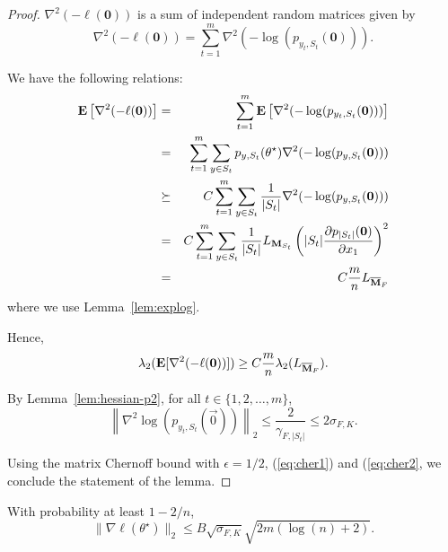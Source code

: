 \begin{proof}
$\nabla^2(-\ell({\bm 0}))$ is a sum of independent random matrices given by
$$
\nabla^2(-\ell({\bm 0})) = \sum_{t=1}^m \nabla^2 (-\log (p_{y_t,S_t}({\bm 0}))).
$$

We have the following relations:
\begin{eqnarray}
\mathbf{E}\left[\nabla^2 (-\ell({\bm 0}))\right] 
&=& \sum_{t=1}^m \mathbf{E}\left[\nabla^2(-\log (p_{y_t,S_t}({\bm 0})))\right]  \cr
&=& \sum_{t=1}^m \sum_{y\in S_t} p_{y,S_t}(\theta^\star)\nabla^2(-\log (p_{y,S_t}({\bm 0})))\cr
&\succeq & C \sum_{t=1}^m \sum_{y\in S_t} \frac{1}{|S_t|} \nabla^2(-\log (p_{y,S_t}({\bm 0})))\cr
& = & C \sum_{t=1}^m \sum_{y\in S_t} \frac{1}{|S_t|} L_{\mathbf{M}_{S_t}} \left(|S_t|\frac{\partial p_{|S_t|}(\mathbf{0})}{\partial x_1}\right)^2\nonumber 
\label{equ:temp}\\
&=& C \frac{m}{n}  L_{\overline{\mathbf{M}}_F}\nonumber
\label{eq:E-hessian}
\end{eqnarray}
where we use Lemma~\ref{lem:explog}.

Hence,
\begin{equation}
\lambda_2(\mathbf{E}[\nabla^2 (-\ell ({\bm 0}))]) \ge C \frac{m}{n} \lambda_2(L_{\overline{\mathbf{M}}_F}).
\label{eq:cher1}
\end{equation} 

By Lemma~\ref{lem:hessian-p2}, for all $t\in \{1,2,\ldots,m\}$,
\begin{equation}
\left\| \nabla^2 \log(p_{y_t,S_t} (\vec{0})) \right\|_2 \le \frac{2}{\gamma_{F, |S_t|}} \leq 2 \sigma_{F,K}.
\label{eq:cher2}
\end{equation}

Using the matrix Chernoff bound with $\epsilon = 1/2$, (\ref{eq:cher1}) and (\ref{eq:cher2}, we conclude the statement of the lemma.
\end{proof}


\begin{lemma} With probability at least $1-2/n$,
$$
\|\nabla \ell (\theta^\star) \|_2 \le  B\sqrt{\sigma_{F,K}}\sqrt{2m(\log(n) +2)}.
$$
\label{lem:kgrad}
\end{lemma}

